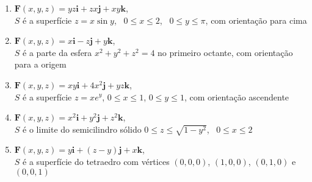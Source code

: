\documentclass[a4paper, 12pt]{article}
\begin{document}
\begin{enumerate}[resume]
		\item $\textbf{F}(x,y,z) = yz\textbf{i} + zx\textbf{j} + xy\textbf{k}$, \\ $S$ é a superfície $z = x\sin{y}$, \, $0 \leq x \leq 2$, \, $0 \leq y \leq \pi$, com orientação para cima

		\item $\textbf{F}(x,y,z) = x\textbf{i} - z\textbf{j} + y\textbf{k}$, \\ $S$ é a parte da esfera $x^2 + y^2 + z^2 = 4$ no primeiro octante, com orientação para a origem
		\resposta{\fazer}

		\item $\textbf{F}(x,y,z) = xy\textbf{i} + 4x^{2}\textbf{j} + yz\textbf{k}$, \\ $S$ é a superfície $z = xe^y$, $0 \leq x \leq 1$, $0 \leq y \leq 1$, com orientação ascendente
		\resposta{\fazer}

		\item $\textbf{F}(x,y,z) = x^{2}\textbf{i} + y^{2}\textbf{j} + z^{2}\textbf{k}$, \\ $S$ é o limite do semicilindro sólido $0 \leq z \leq \sqrt{1 - y^2}$, \, $0 \leq x \leq 2$

		\item $\textbf{F}(x,y,z) = y\textbf{i} + (z - y)\textbf{j} + x\textbf{k}$, \\ $S$ é a superfície do tetraedro com vértices $(0,0,0)$, $(1,0,0)$, $(0,1,0)$ e $(0,0,1)$
	
	\end{enumerate}
		
	\vspace{5mm}	
	
\end{document}
